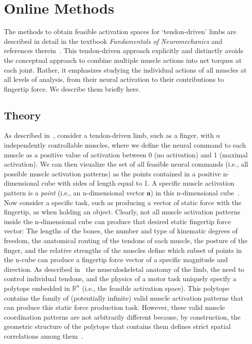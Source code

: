 \documentclass[letterpaper]{article}
\begin{document}
\section*{Online Methods}
The methods to obtain feasible activation spaces for `tendon-driven' limbs are described in detail in the textbook \emph{Fundamentals of Neuromechanics} and references therein~\cite{valero-cuevas2015fundamentals}. This tendon-driven approach explicitly and distinctly avoids the conceptual approach to combine multiple muscle actions into net torques at each joint. Rather, it emphasizes studying the individual actions of all muscles at all levels of analysis, from their neural activation to their contributions to fingertip force. We describe them briefly here.
\label{s:methods}
\subsection*{Theory}
As described in~\cite{valero-cuevas2015fundamentals}, consider a tendon-driven limb, such as a finger, with $n$ independently controllable muscles, where we define the neural command to each muscle as a positive value of activation between 0 (no activation) and 1 (maximal activation).
We can then visualize the set of all feasible neural commands (i.e., all possible muscle activation patterns) as the points contained in a positive n-dimensional cube with sides of length equal to 1. A specific muscle activation pattern is a \emph{point} (i.e., an n-dimensional vector $\textbf{a}$) in this n-dimensional cube~\cite{Chao1978Graphical, spoor1983balancing, Kuo1993Human, Valero-Cuevas1998Large}.
Now consider a specific task, such as producing a vector of static force with the fingertip, as when holding an object. Clearly, not all muscle activation patterns inside the n-dimensional cube can produce that desired static fingertip force vector: The lengths of the bones, the number and type of kinematic degrees of freedom, the anatomical routing of the tendons of each muscle, the posture of the finger, and the relative strengths of the muscles define which subset of points in the n-cube can produce a fingertip force vector of a specific magnitude and direction.
As described in~\cite{Chao1978Graphical, spoor1983balancing, Kuo1993Human, valero-cuevas2015fundamentals} the musculoskeletal anatomy of the limb, the need to control individual tendons, and the physics of a motor task uniquely specify a polytope embedded in $\mathbb{R}^n$ (i.e., the feasible activation space). This polytope contains the family of (potentially infinite) valid muscle activation patterns that can produce this static force production task.
However, these valid muscle coordination patterns are not arbitrarily different because, by construction, the geometric structure of the polytope that contains them defines strict spatial correlations among them~\cite{kutch2012challenges}.
\end{document}
